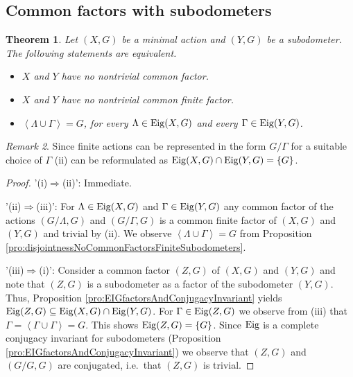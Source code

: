 \documentclass[12pt, reqno]{amsart}
\newtheorem{theorem}{Theorem}[section]
\theoremstyle{definition}
\theoremstyle{remark}
\newtheorem{remark}[theorem]{Remark}
\numberwithin{equation}{section}
\theoremstyle{theorem}
\theoremstyle{remark}
\newcommand{\grouphull}[1]{\left\langle #1 \right\rangle}
\def\Eig{{\rm Eig}}
\begin{document}
\subsection{Common factors with subodometers}
\label{subsec:DisjointnessOfSubodometers_CommonFactorsWithSubodometers}

\begin{theorem}
\label{the:characterizationNNCFsubodometers}
    Let $(X,G)$ be a minimal action and $(Y,G)$ be a subodometer. 
    The following statements are equivalent. 
    \begin{itemize}
        \item[(i)]$X$ and $Y$ have no nontrivial common factor.
        \item[(ii)]
        $X$ and $Y$ have no nontrivial common finite factor.
        \item[(iii)]
        $\grouphull{\Lambda\cup\Gamma}=G$, for every $\Lambda\in \Eig(X,G)$ and every $\Gamma\in \Eig(Y,G)$.
    \end{itemize}    
\end{theorem}
\begin{remark}
    Since finite actions can be represented in the form $G/\Gamma$ for a suitable choice of $\Gamma$ (ii) can be reformulated as $\Eig(X,G)\cap \Eig(Y,G)=\{G\}$. 
\end{remark}
\begin{proof}
'(i)$\Rightarrow$(ii)': 
    Immediate. 

'(ii)$\Rightarrow$(iii)':
    For $\Lambda\in \Eig(X,G)$ and $\Gamma\in \Eig(Y,G)$ any common factor of the actions 
    $(G/\Lambda,G)$ and $(G/\Gamma,G)$ is a common finite factor of $(X,G)$ and $(Y,G)$ and trivial by (ii). 
    We observe $\grouphull{\Lambda\cup \Gamma}=G$ from Proposition \ref{pro:disjointnessNoCommonFactorsFiniteSubodometers}. 

'(iii)$\Rightarrow$(i)':
    Consider a common factor $(Z,G)$ of $(X,G)$ and $(Y,G)$
    and note that $(Z,G)$ is a subodometer as a factor of the subodometer $(Y,G)$.   
    Thus, Proposition \ref{pro:EIGfactorsAndConjugacyInvariant} yields $\Eig(Z,G)\subseteq \Eig(X,G)\cap \Eig(Y,G)$. 
    For $\Gamma\in \Eig(Z,G)$ we observe from (iii) that $\Gamma=\grouphull{\Gamma\cup \Gamma}=G$. 
    This shows $\Eig(Z,G)=\{G\}$. 
    Since $\Eig$ is a complete conjugacy invariant for subodometers (Proposition \ref{pro:EIGfactorsAndConjugacyInvariant}) we observe that $(Z,G)$ and $(G/G,G)$ are conjugated, i.e.\ that $(Z,G)$ is trivial. 
\end{proof}
\end{document}
